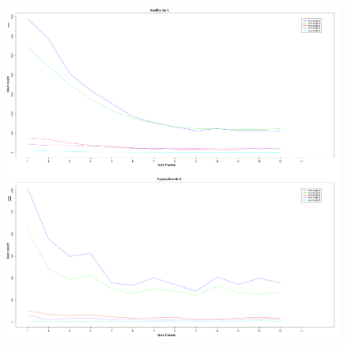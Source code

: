\documentclass[a4paper,12pt]{article}
\begin{document}
\begin{figure}[h!]
\begin{center}
\includegraphics[width=15cm,height=16cm]{countChangeTime1.png}
\end{center}
\end{figure}
\newpage
\end{document}
